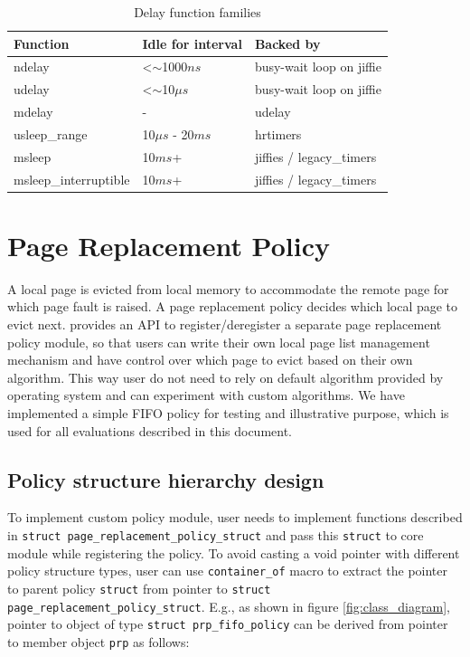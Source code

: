 \begin{table}[]
	\centering
	\caption{Delay function families}
	\label{delay_functions}
	\begin{tabular}{lll}
		\hline
		\textbf{Function}     & \textbf{Idle for interval} & \textbf{Backed by}       \\ \hline
		ndelay                & \textless$\sim$1000$ns$     & busy-wait loop on jiffie \\
		udelay                & \textless $\sim$10${\mu}s$ & busy-wait loop on jiffie \\
		mdelay                & -                          & udelay                   \\
		usleep\_range         & 10${\mu}s$ - 20$ms$                & hrtimers                 \\
		msleep                & 10$ms$+                      & jiffies / legacy\_timers \\
		msleep\_interruptible & 10$ms$+                      & jiffies / legacy\_timers \\ \hline
	\end{tabular}
\end{table}


\section{Page Replacement Policy}
A local page is evicted from local memory to accommodate the remote page for which page fault is raised. A page replacement policy decides which local page to evict next. {\dime} provides an API to register/deregister a separate page replacement policy module, so that users can write their own local page list management mechanism and have control over which page to evict based on their own algorithm. This way user do not need to rely on default algorithm provided by operating system and can experiment with custom algorithms. We have implemented a simple FIFO policy for testing and illustrative purpose, which is used for all evaluations described in this document.

\subsection{Policy structure hierarchy design}
To implement custom policy module, user needs to implement functions described in \verb|struct page_replacement_policy_struct| and pass this \verb|struct| to core module while registering the policy. To avoid casting a void pointer with different policy structure types, user can use \verb|container_of| macro to extract the pointer to parent policy \verb|struct| from pointer to \verb|struct page_replacement_policy_struct|. E.g., as shown in figure \ref{fig:class_diagram}, pointer to object of type \verb|struct prp_fifo_policy| can be derived from pointer to member object \verb|prp| as follows:

